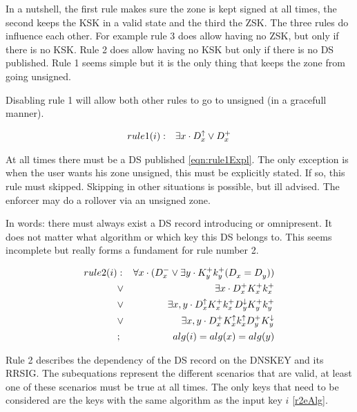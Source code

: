 \documentclass[twoside, a4paper]{article}
\begin{document}
In a nutshell, the first rule makes sure the zone is kept signed at all times, the second keeps the KSK in a valid state and the third the ZSK. The three rules do influence each other. For example rule 3 does allow having no ZSK, but only if there is no KSK. Rule 2 does allow having no KSK but only if there is no DS published. Rule 1 seems simple but it is the only thing that keeps the zone from going unsigned.

Disabling rule 1 will allow both other rules to go to unsigned (in a gracefull manner).

\begin{eqnarray}
\label{eqn:rule1Expl}
rule1(i)
&:& 	\exists x\cdot D_{x}^{\uparrow} \vee D_{x}^{+}
\end{eqnarray}

At all times there must be a DS published \eqref{eqn:rule1Expl}. The only exception is when the user wants his zone unsigned, this must be explicitly stated. If so, this rule must skipped. Skipping in other situations is possible, but ill advised. The enforcer may do a rollover via an unsigned zone.

In words: there must always exist a DS record introducing or omnipresent. It does not matter what algorithm or which key this DS belongs to. This seems incomplete but really forms a fundament for rule number 2.

\begin{subequations}
\label{eqn:rule2Expl}
\begin{align}
rule2(i)
&:&		\forall x \cdot (D_{x}^{-} \vee \exists y \cdot K_{y}^{+}k_{y}^{+} (D_{x}^{}=D_{y}^{}) ) \label{r2eUnsigned}\\
&\vee& 	\exists x\cdot D_{x}^{+} K_{x}^{+} k_{x}^{+} \label{r2eTrivial}\\
&\vee& 	\exists x,y\cdot D_{x}^{\uparrow} K_{x}^{+} k_{x}^{+} D_{y}^{\downarrow} K_{y}^{+} k_{y}^{+} \label{r2eMinds}\\
&\vee&	\exists x,y\cdot D_{x}^{+} K_{x}^{\uparrow} k_{x}^{\uparrow}	D_{y}^{+} K_{y}^{\downarrow} \label{r2eMinkey}\\
&;&		alg(i)=alg(x)=alg(y) \label{r2eAlg}
\end{align}
\end{subequations}

Rule 2 describes the dependency of the DS record on the DNSKEY and its RRSIG. The subequations represent the different scenarios that are valid, at least one of these scenarios must be true at all times. The only keys that need to be considered are the keys with the same algorithm as the input key $i$ \eqref{r2eAlg}.
\end{document}
